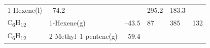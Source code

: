 \documentclass[
]{book}
\theoremstyle{definition}
\theoremstyle{definition}
\theoremstyle{definition}
\theoremstyle{remark}
\begin{document}
\begin{longtable}[]{@{}llllll@{}}
\begin{minipage}[t]{0.17\columnwidth}
1-Hexene(l)\strut
\end{minipage} & \begin{minipage}[t]{0.15\columnwidth}\raggedright
--74.2\strut
\end{minipage} & \begin{minipage}[t]{0.15\columnwidth}\raggedright
\strut
\end{minipage} & \begin{minipage}[t]{0.14\columnwidth}\raggedright
295.2\strut
\end{minipage} & \begin{minipage}[t]{0.14\columnwidth}\raggedright
183.3\strut
\end{minipage}\tabularnewline
\begin{minipage}[t]{0.07\columnwidth}\raggedright
C\textsubscript{6}H\textsubscript{12}\strut
\end{minipage} & \begin{minipage}[t]{0.17\columnwidth}\raggedright
1-Hexene(g)\strut
\end{minipage} & \begin{minipage}[t]{0.15\columnwidth}\raggedright
--43.5\strut
\end{minipage} & \begin{minipage}[t]{0.15\columnwidth}\raggedright
87\strut
\end{minipage} & \begin{minipage}[t]{0.14\columnwidth}\raggedright
385\strut
\end{minipage} & \begin{minipage}[t]{0.14\columnwidth}\raggedright
132\strut
\end{minipage}\tabularnewline
\begin{minipage}[t]{0.07\columnwidth}\raggedright
C\textsubscript{6}H\textsubscript{12}\strut
\end{minipage} & \begin{minipage}[t]{0.17\columnwidth}\raggedright
2-Methyl--1-pentene(g)\strut
\end{minipage} & \begin{minipage}[t]{0.15\columnwidth}\raggedright
--59.4\strut
\end{minipage} & \begin{minipage}[t]{0.15\columnwidth}\raggedright
\strut
\end{minipage} & \begin{minipage}[t]{0.14\columnwidth}\raggedright
\strut
\end{minipage} & \begin{minipage}[t]{0.14\columnwidth}\raggedright

\end{minipage}
\end{longtable}
\end{document}
